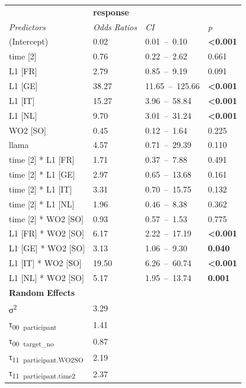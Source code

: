 \begin{table}
    \begin{tabularx}{\textwidth}{XXXX}
    \lsptoprule
    \textbf{~} & \multicolumn{3}{X}{ \textbf{response}}\\
    \textit{Predictors} & \textit{Odds} \textit{Ratios} & \textit{CI} & \textit{p}\\
    \midrule
    (Intercept) & 0.02 & 0.01~–~0.10 & \textbf{<0.001}\\
    time [2] & 0.76 & 0.22~–~2.62 & 0.661\\
    L1 [FR] & 2.79 & 0.85~–~9.19 & 0.091\\
    L1 [GE] & 38.27 & 11.65~–~125.66 & \textbf{<0.001}\\
    L1 [IT] & 15.27 & 3.96~–~58.84 & \textbf{<0.001}\\
    L1 [NL] & 9.70 & 3.01~–~31.24 & \textbf{<0.001}\\
    WO2 [SO] & 0.45 & 0.12~–~1.64 & 0.225\\
    llama & 4.57 & 0.71~–~29.39 & 0.110\\
    time [2] * L1 [FR] & 1.71 & 0.37~–~7.88 & 0.491\\
    time [2] * L1 [GE] & 2.97 & 0.65~–~13.68 & 0.161\\
    time [2] * L1 [IT] & 3.31 & 0.70~–~15.75 & 0.132\\
    time [2] * L1 [NL] & 1.96 & 0.46~–~8.38 & 0.362\\
    time [2] * WO2 [SO] & 0.93 & 0.57~–~1.53 & 0.775\\
    L1 [FR] * WO2 [SO] & 6.17 & 2.22~–~17.19 & \textbf{<0.001}\\
    L1 [GE] * WO2 [SO] & 3.13 & 1.06~–~9.30 & \textbf{0.040}\\
    L1 [IT] * WO2 [SO] & 19.50 & 6.26~–~60.74 & \textbf{<0.001}\\
    L1 [NL] * WO2 [SO] & 5.17 & 1.95~–~13.74 & \textbf{0.001}\\
    \multicolumn{4}{X}{\textbf{Random} \textbf{Effects}}\\
    σ\textsuperscript{2} & \multicolumn{3}{X}{3.29}\\
    τ\textsubscript{00}~\textsubscript{participant} & \multicolumn{3}{X}{1.41}\\
    τ\textsubscript{00}~\textsubscript{target\_no} & \multicolumn{3}{X}{0.87}\\
    τ\textsubscript{11}~\textsubscript{participant.WO2SO} & \multicolumn{3}{X}{2.19}\\
    τ\textsubscript{11}~\textsubscript{participant.time2} & \multicolumn{3}{X}{2.37}\\

\end{tabularx}
\end{table}
